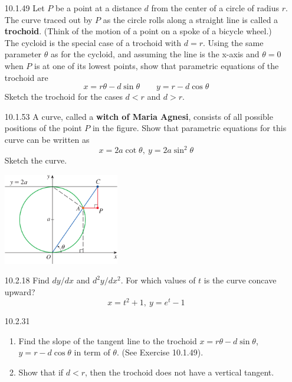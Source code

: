 \documentclass{article}
\begin{document}
\begin{enumerate}
    \vspace{6cm}

\item[10.1.49]
    Let $P$ be a point at a distance $d$ from the center of a circle of radius $r$.
    The curve traced out by $P$ as the circle rolls along a straight line is called
    a \textbf{trochoid}.
    (Think of the motion of a point on a spoke of a bicycle wheel.)
    The cycloid is the special case of a trochoid with $d=r$.
    Using the same parameter $\theta$ as for the cycloid, and assuming the line is
    the x-axis and $\theta=0$ when $P$ is at one of its lowest points,
    show that parametric equations of the trochoid are
    \[ x=r\theta-d\sin{\theta} \qquad y=r-d\cos{\theta}\]
    Sketch the trochoid for the cases $d<r$ and $d>r$.

    \newpage

\item[10.1.53]
    A curve, called a \textbf{witch of Maria Agnesi}, consists of all possible
    positions of the point $P$ in the figure. Show that parametric
    equations for this curve can be written as
    \[x=2a\cot{\theta},\ y=2a\sin^{2}{\theta}\]
    Sketch the curve.

    \begin{center}
        \includegraphics[height=4cm]{./png/10.1.53.png}
    \end{center}

\vspace{4cm}

\item[10.2.18]
    Find $dy/dx$ and $d^{2}y/dx^{2}$. For which values of $t$ is the curve concave upward?
    \[x=t^2+1,\ y=e^{t}-1\]

\vspace{4cm}

\item[10.2.31]
    \begin{enumerate}
        \item Find the slope of the tangent line to the trochoid $x=r\theta-d\sin{\theta}$,
            $y=r-d\cos{\theta}$ in term of $\theta$. (See Exercise 10.1.49).
        \item Show that if $d < r$, then the trochoid does not have a vertical tangent.
    \end{enumerate}


\end{enumerate}
\end{document}
